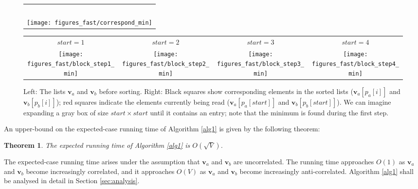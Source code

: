 \documentclass[a4paper,10pt]{article}
\newtheorem{theorem}{Theorem}
\begin{document}
\begin{figure*}[ht]
\footnotesize
\begin{center}
\parbox[c]{31.58pt}{\centering\begin{tabular}{c}
                                     \ \\ \texttt{[image: figures\_fast/correspond\_min]}
                                    \end{tabular}
}
\parbox[c]{309.38pt}
{\centering\begin{tabular}{cccc}
$\mathit{start} = 1$ & $\mathit{start} = 2$ & $\mathit{start} = 3$ & $\mathit{start} = 4$\\
\texttt{[image: figures\_fast/block\_step1\_min]} & \texttt{[image: figures\_fast/block\_step2\_min]} & \texttt{[image: figures\_fast/block\_step3\_min]} & \texttt{[image: figures\_fast/block\_step4\_min]}
\end{tabular}}
\end{center}
\vspace{-3mm}
 \caption{Left: The lists $\mathbf{v}_a$ and $\mathbf{v}_b$ before sorting. Right: Black squares show corresponding elements in the sorted lists ($\mathbf{v}_a[p_a[i]]$ and $\mathbf{v}_b[p_b[i]]$); red squares indicate the elements currently being read ($\mathbf{v}_a[p_a[\mathit{start}]]$ and $\mathbf{v}_b[p_b[\mathit{start}]]$). We can imagine expanding a gray box of size $\mathit{start}\times\mathit{start}$ until it contains an entry; note that the minimum is found during the first step.}
\label{fig:alg1}\end{figure*}

An upper-bound on the expected-case running time of Algorithm \ref{alg1} is given by the following theorem:
\begin{theorem}
 The \emph{expected} running time of Algorithm \ref{alg1} is $O(\sqrt{V})$.
\label{the:alg1}
\end{theorem}
The expected-case running time arises under the assumption that $\mathbf{v}_a$ and $\mathbf{v}_b$ are uncorrelated. The running time approaches $O(1)$ as $\mathbf{v}_a$ and $\mathbf{v}_b$ become increasingly correlated, and it approaches $O(V)$ as $\mathbf{v}_a$ and $\mathbf{v}_b$ become increasingly anti-correlated. Algorithm \ref{alg1} shall be analysed in detail in Section \ref{sec:analysis}.
\end{document}
